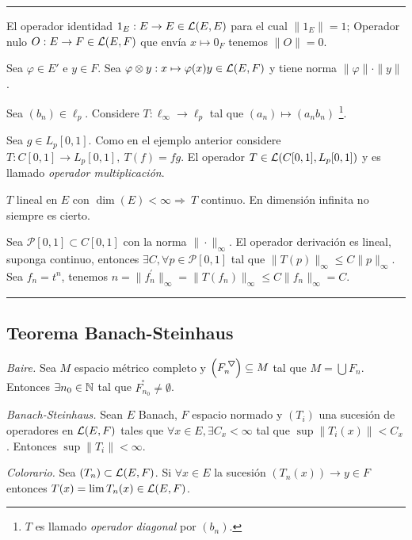 \hrule 
\begin{example}
    El operador identidad \(1_E: E \to E \in \mathcal{L}(E,E)\) para el cual \(\|1_E\|=1\); Operador nulo \(O:E\to F \in \mathcal{L}(E,F)\) que envía \(x\mapsto 0_F\) tenemos \(\|O\| = 0\). 
\end{example}
\begin{example}
    Sea \(\varphi \in E'\) e \(y\in F\). Sea \(\varphi \otimes y: x \mapsto \varphi(x)y \in \mathcal{L}(E,F)\) y tiene norma \(\|\varphi\|\cdot\|y\|\).  
\end{example}
\begin{example}
    Sea \((b_n) \in \ell_p\). Considere \(T:\ell_\infty \to \ell_p\) tal que \((a_n)\mapsto (a_nb_n)\) \footnote{\(T\) es llamado \emph{operador diagonal} por \((b_n)\).}. 
\end{example}
\begin{example}
    Sea \(g\in L_p[0,1]\). Como en el ejemplo anterior considere \(T:C[0,1] \to L_p[0,1], \ T(f) = fg\). El operador \(T\in \mathcal{L}(C[0,1],L_p[0,1])\) y es llamado \emph{operador multiplicación}. 
\end{example}
\begin{exercise}
    \(T\) lineal en \(E\) con \(\dim(E)<\infty \Rightarrow \ T \) continuo. En dimensión infinita no siempre es cierto. 
\end{exercise}
\begin{example}
    Sea \(\mathcal{P}[0,1]\subset C[0,1]\) con la norma \(\|\cdot\|_\infty \). El operador derivación es lineal, suponga continuo, entonces \(\exists C, \forall p \in \mathcal{P}[0,1] \) tal que \(\|T(p)\|_\infty \leq C\|p\|_\infty\). Sea \(f_n = t^n\), tenemos \(n = \|f_n^{'}\|_\infty = \| T(f_n)\|_\infty \leq C\|f_n\|_\infty = C \). 
\end{example}
\hrule 

\subsection*{Teorema Banach-Steinhaus}

\begin{theorem}
    \emph{Baire.} Sea \(M\) espacio métrico completo y \(\left(F^\ce_n\right) \subseteq M\) tal que \(M=\bigcup F_n\). Entonces \(\exists n_0\in \mathbb{N}\) tal que \(\overset{\circ}{F_{n_0}} \neq \emptyset\).    
\end{theorem}
\begin{theorem}
    \emph{Banach-Steinhaus.} Sean \(E\) Banach, \(F\) espacio normado y \((T_i)\) una sucesión de operadores en \(\mathcal{L}(E,F)\) tales que \(\forall x\in E,\exists C_x <\infty\) tal que \(\sup \|T_i(x)\| < C_x\). Entonces \(\sup \|T_i\| < \infty\).  
\end{theorem}
\begin{note}
    \emph{Colorario.} Sea \((T_n)\subset \mathcal{L}(E,F)\). Si \(\forall x\in E\) la sucesión \((T_n(x)) \to y\in F\) entonces \(T(x) = \lim T_n(x) \in \mathcal{L}(E,F)\).  
\end{note}

